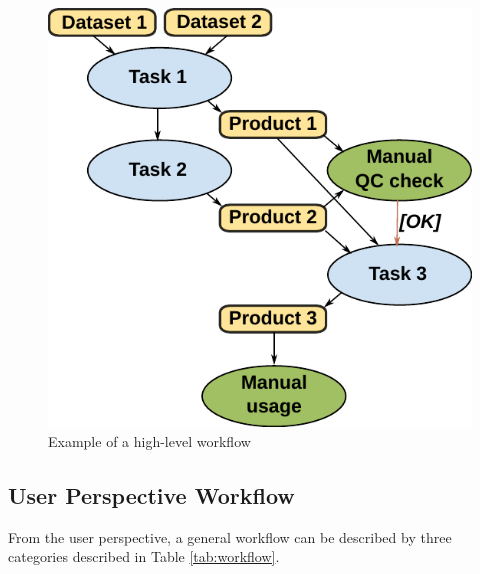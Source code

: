 \documentclass[a4paper]{article}
\begin{document}
\begin{figure}[H]
  \centering
  \includegraphics[width=0.4\columnwidth]{workflow}
  \caption{Example of a high-level workflow}
  \label{fig:workflow}
\end{figure}

\subsection{User Perspective Workflow}

From the user perspective, a general workflow can be described by three categories described in Table \ref{tab:workflow}.
\end{document}

